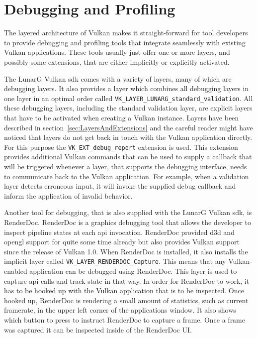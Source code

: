   \section{Debugging and Profiling}
  \label{sec:DebuggingAndProfiling}
    The layered architecture of Vulkan makes it straight-forward for tool developers to provide debugging and profiling tools that integrate seamlessly with existing Vulkan applications. These tools usually just offer one or more layers, and possibly some extensions, that are either implicitly or explicitly activated.

    The LunarG Vulkan \gls{sdk} comes with a variety of layers, many of which are debugging layers. It also provides a layer which combines all debugging layers in one layer in an optimal order called \lstinline{VK_LAYER_LUNARG_standard_validation}. All these debugging layers, including the standard validation layer, are explicit layers that have to be activated when creating a Vulkan instance. Layers have been described in section~\ref{sec:LayersAndExtensions} and the careful reader might have noticed that layers do not get back in touch with the Vulkan application directly. For this purpose the \lstinline{VK_EXT_debug_report} extension is used. This extension provides additional Vulkan commands that can be used to supply a callback that will be triggered whenever a layer, that supports the debugging interface, needs to communicate back to the Vulkan application. For example, when a validation layer detects erroneous input, it will invoke the supplied debug callback and inform the application of invalid behavior.

    Another tool for debugging, that is also supplied with the LunarG Vulkan \gls{sdk}, is RenderDoc\cite{renderdoc}. RenderDoc is a graphics debugging tool that allows the developer to inspect pipeline states at each \gls{api} invocation. RenderDoc provided \gls{d3d} and \gls{opengl} support for quite some time already but also provides Vulkan support since the release of Vulkan 1.0. When RenderDoc is installed, it also installs the implicit layer called \lstinline{VK_LAYER_RENDERDOC_Capture}. This means that any Vulkan-enabled application can be debugged using RenderDoc. This layer is used to capture \gls{api} calls and track state in that way. In order for RenderDoc to work, it has to be hooked up with the Vulkan application that is to be inspected. Once hooked up, RenderDoc is rendering a small amount of statistics, such as current framerate, in the upper left corner of the applications window. It also shows which button to press to instruct RenderDoc to capture a frame. Once a frame was captured it can be inspected inside of the RenderDoc UI.

